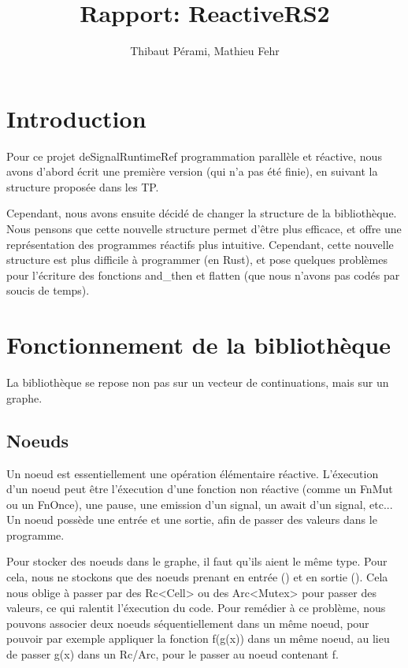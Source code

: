 \documentclass[a4paper]{article}
\title{Rapport: ReactiveRS2}
\author{Thibaut Pérami, Mathieu Fehr}
\renewcommand{\(}{\left(}
\renewcommand{\)}{\right)}
\begin{document}
\maketitle

\section{Introduction}

Pour ce projet deSignalRuntimeRef programmation parallèle et réactive, nous avons d'abord écrit
une première version (qui n'a pas été finie), en suivant la structure proposée
dans les TP.

Cependant, nous avons ensuite décidé de changer la structure de la bibliothèque.
Nous pensons que cette nouvelle structure permet d'être plus efficace, et offre
une représentation des programmes réactifs plus intuitive. Cependant, cette
nouvelle structure est plus difficile à programmer (en Rust), et pose quelques
problèmes pour l'écriture des fonctions and\_then et flatten (que nous n'avons
pas codés par soucis de temps).

\section{Fonctionnement de la bibliothèque}

La bibliothèque se repose non pas sur un vecteur de continuations, mais sur un
graphe. 

\subsection{Noeuds}

Un noeud est essentiellement une opération élémentaire
réactive. L'éxecution d'un noeud peut être l'éxecution d'une fonction non
réactive (comme un FnMut ou un FnOnce), une pause, une emission d'un signal, un
await d'un signal, etc... Un noeud possède une entrée et une sortie, afin de
passer des valeurs dans le programme.

Pour stocker des noeuds dans le graphe, il faut qu'ils aient le même type. Pour
cela, nous ne stockons que des noeuds prenant en entrée () et en sortie ().
Cela nous oblige à passer par des Rc<Cell> ou des Arc<Mutex> pour passer des
valeurs, ce qui ralentit l'éxecution du code. Pour remédier à ce problème, nous
pouvons associer deux noeuds séquentiellement dans un même noeud, pour pouvoir
par exemple appliquer la fonction f(g(x)) dans un même noeud, au lieu de passer
g(x) dans un Rc/Arc, pour le passer au noeud contenant f.
\end{document}
